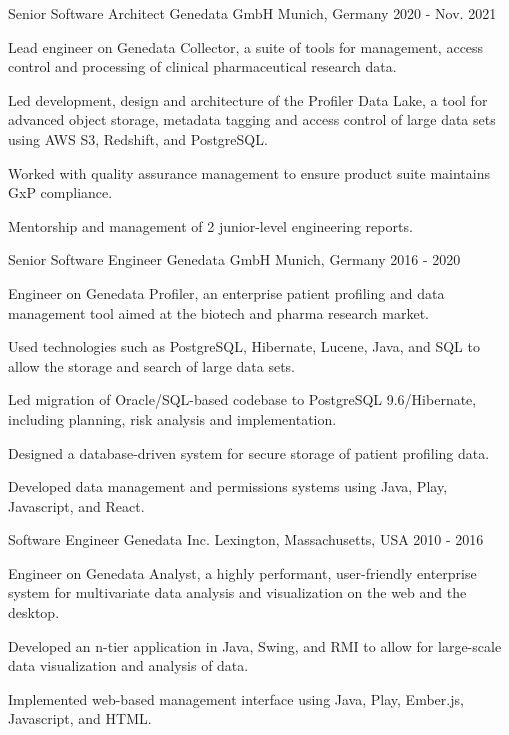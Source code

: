 \begin{cventries}
  \cventry
  {Senior Software Architect} %
  {Genedata GmbH} %
  {Munich, Germany} %
  {2020 - Nov. 2021} %
  {
    \begin{cvitems} %
      \item {Lead engineer on Genedata Collector, a suite of tools for management, access control and processing of clinical pharmaceutical research data.}
      \item {Led development, design and architecture of the Profiler Data Lake, a tool for advanced object storage, metadata tagging and access control of large data sets using AWS S3, Redshift, and PostgreSQL.}
      \item {Worked with quality assurance management to ensure product suite maintains GxP compliance.}
      \item {Mentorship and management of 2 junior-level engineering reports.}
    \end{cvitems}
  }

  \cventry
  {Senior Software Engineer} %
  {Genedata GmbH} %
  {Munich, Germany} %
  {2016 - 2020} %
  {
    \begin{cvitems} %
      \item {Engineer on Genedata Profiler, an enterprise patient profiling and data management tool aimed at the biotech and pharma research market.}
      \item {Used technologies such as PostgreSQL, Hibernate, Lucene, Java, and SQL to allow the storage and search of large data sets.}
      \item {Led migration of Oracle/SQL-based codebase to PostgreSQL 9.6/Hibernate, including planning, risk analysis and implementation.}
      \item {Designed a database-driven system for secure storage of patient profiling data.}
      \item {Developed data management and permissions systems using Java, Play, Javascript, and React.}
    \end{cvitems}
  }

\cventry
{Software Engineer} %
{Genedata Inc.} %
{Lexington, Massachusetts, USA} %
{2010 - 2016} %
{
  \begin{cvitems} %
    \item {Engineer on Genedata Analyst, a highly performant, user-friendly enterprise system for multivariate data analysis and visualization on the web and the desktop.}
    \item {Developed an n-tier application in Java, Swing, and RMI to allow for large-scale data visualization and analysis of data.}
    \item {Implemented web-based management interface using Java, Play, Ember.js, Javascript, and HTML.}
  \end{cvitems}
}


\end{cventries}
